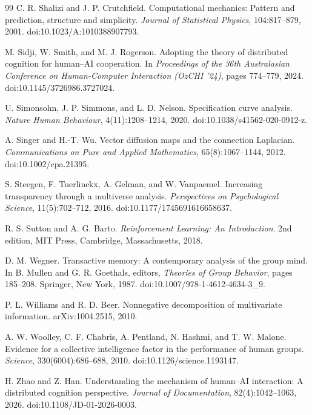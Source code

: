 \begin{thebibliography}{99}
C. R. Shalizi and J. P. Crutchfield.
\newblock Computational mechanics: Pattern and prediction, structure and simplicity.
\newblock \emph{Journal of Statistical Physics}, 104:817--879, 2001.
\newblock doi:10.1023/A:1010388907793.

M. Sidji, W. Smith, and M. J. Rogerson.
\newblock Adopting the theory of distributed cognition for human--AI cooperation.
\newblock In \emph{Proceedings of the 36th Australasian Conference on Human-Computer Interaction (OzCHI '24)}, pages 774--779, 2024.
\newblock doi:10.1145/3726986.3727024.

U. Simonsohn, J. P. Simmons, and L. D. Nelson.
\newblock Specification curve analysis.
\newblock \emph{Nature Human Behaviour}, 4(11):1208--1214, 2020.
\newblock doi:10.1038/s41562-020-0912-z.

A. Singer and H.-T. Wu.
\newblock Vector diffusion maps and the connection Laplacian.
\newblock \emph{Communications on Pure and Applied Mathematics}, 65(8):1067--1144, 2012.
\newblock doi:10.1002/cpa.21395.

S. Steegen, F. Tuerlinckx, A. Gelman, and W. Vanpaemel.
\newblock Increasing transparency through a multiverse analysis.
\newblock \emph{Perspectives on Psychological Science}, 11(5):702--712, 2016.
\newblock doi:10.1177/1745691616658637.

R. S. Sutton and A. G. Barto.
\newblock \emph{Reinforcement Learning: An Introduction}.
\newblock 2nd edition, MIT Press, Cambridge, Massachusetts, 2018.

D. M. Wegner.
\newblock Transactive memory: A contemporary analysis of the group mind.
\newblock In B. Mullen and G. R. Goethals, editors, \emph{Theories of Group Behavior}, pages 185--208. Springer, New York, 1987.
\newblock doi:10.1007/978-1-4612-4634-3\_9.

P. L. Williams and R. D. Beer.
\newblock Nonnegative decomposition of multivariate information.
\newblock arXiv:1004.2515, 2010.

A. W. Woolley, C. F. Chabris, A. Pentland, N. Hashmi, and T. W. Malone.
\newblock Evidence for a collective intelligence factor in the performance of human groups.
\newblock \emph{Science}, 330(6004):686--688, 2010.
\newblock doi:10.1126/science.1193147.

H. Zhao and Z. Han.
\newblock Understanding the mechanism of human--AI interaction: A distributed cognition perspective.
\newblock \emph{Journal of Documentation}, 82(4):1042--1063, 2026.
\newblock doi:10.1108/JD-01-2026-0003.



\end{thebibliography}
